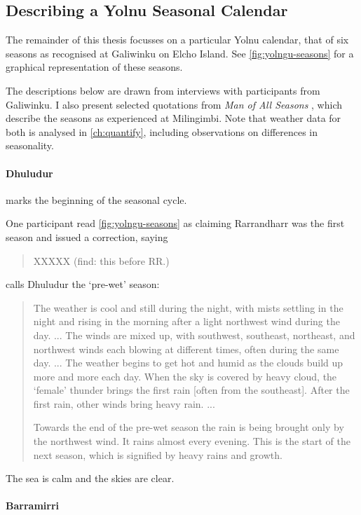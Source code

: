 \subsection{Describing a Yolnu Seasonal Calendar}

The remainder of this thesis focusses on a particular Yolnu calendar,
that of six seasons as recognised at Galiwinku on Elcho Island.
See \autoref{fig:yolngu-seasons} for a graphical representation of these seasons.

The descriptions below are drawn from interviews with participants from Galiwinku.
I also present selected quotations from \textit{Man of All Seasons} \citep{davis1989},
which describe the seasons as experienced at Milingimbi.
Note that weather data for both is analysed in \autoref{ch:quantify},
including observations on differences in seasonality.


\paragraph{Dhuludur} marks the beginning of the seasonal cycle.

One participant read \autoref{fig:yolngu-seasons} as claiming Rarrandharr was the first season
and issued a correction, saying \blockquote{XXXXX (find: this before RR.)}.

\citet{davis1989} calls Dhuludur the `pre-wet' season:
\blockquote{
    The weather is cool and still during the night, with mists settling in the night and rising in the morning after a light northwest wind during the day. ...
    The winds are mixed up, with southwest, southeast, northeast, and northwest winds each blowing at different times, often during the same day. ...
    The weather begins to get hot and humid as the clouds build up more and more each day.
    When the sky is covered by heavy cloud, the `female' thunder brings the first rain [often from the southeast].
    After the first rain, other winds bring heavy rain. ...
    
    Towards the end of the pre-wet season the rain is being brought only by the northwest wind.
    It rains almost every evening.
    This is the start of the next season, which is signified by heavy rains and growth.
}

The sea is calm and the skies are clear.


\paragraph{Barramirri}

